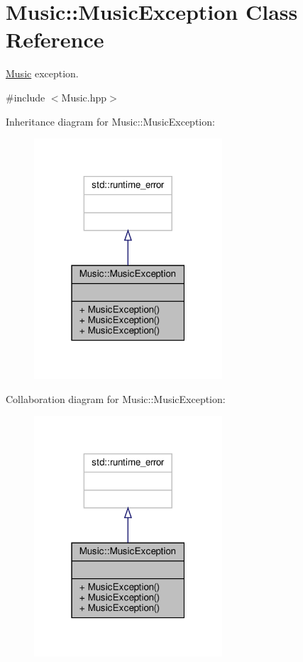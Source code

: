 \hypertarget{class_music_1_1_music_exception}{}\section{Music\+:\+:Music\+Exception Class Reference}
\label{class_music_1_1_music_exception}


\hyperlink{class_music}{Music} exception.  




{\ttfamily \#include $<$Music.\+hpp$>$}



Inheritance diagram for Music\+:\+:Music\+Exception\+:
\nopagebreak
\begin{figure}[H]
\begin{center}
\leavevmode
\includegraphics[width=199pt]{class_music_1_1_music_exception__inherit__graph}
\end{center}
\end{figure}


Collaboration diagram for Music\+:\+:Music\+Exception\+:
\nopagebreak
\begin{figure}[H]
\begin{center}
\leavevmode
\includegraphics[width=199pt]{class_music_1_1_music_exception__coll__graph}
\end{center}
\end{figure}
